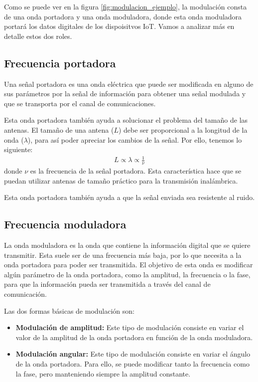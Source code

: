 \documentclass[12pt, letterpaper]{article}
\begin{document}
Como se puede ver en la figura \ref{fig:modulacion_ejemplo}, la modulación consta de una onda portadora y una onda moduladora, donde esta onda moduladora portará los datos digitales de los dispoisitvos IoT. Vamos a analizar más en detalle estos dos roles.

\subsection{Frecuencia portadora}
Una señal portadora es una onda eléctrica que puede ser modificada en alguno de sus parámetros por la señal de información para obtener una señal modulada y que se transporta por el canal de comunicaciones. 

Esta onda portadora también ayuda a solucionar el problema del tamaño de las antenas. El tamaño de una antena ($L$) debe ser proporcional a la longitud de la onda ($\lambda$), para así poder apreciar los cambios de la señal. Por ello, tenemos lo siguiente:
\begin{align*}
    L \propto \lambda \propto \frac{1}{\nu}
\end{align*}
donde $\nu$ es la frecuencia de la señal portadora. Esta característica hace que se puedan utilizar antenas de tamaño práctico para la transmisión inalámbrica.

Esta onda portadora también ayuda a que la señal enviada sea resistente al ruido.

\subsection{Frecuencia moduladora}
La onda moduladora es la onda que contiene la información digital que se quiere transmitir. Esta suele ser de una frecuencia más baja, por lo que necesita a la onda portadora para poder ser transmitida. El objetivo de esta onda es modificar algún parámetro de la onda portadora, como la amplitud, la frecuencia o la fase, para que la información pueda ser transmitida a través del canal de comunicación.

Las dos formas básicas de modulación son:
\begin{itemize}
    \item \textbf{Modulación de amplitud:} Este tipo de modulación consiste en variar el valor de la amplitud de la onda portadora en función de la onda moduladora. 

    \item \textbf{Modulación angular:} Este tipo de modulación consiste en variar el ángulo de la onda portadora. Para ello, se puede modificar tanto la frecuencia como la fase, pero manteniendo siempre la amplitud constante.
\end{itemize}
\end{document}
